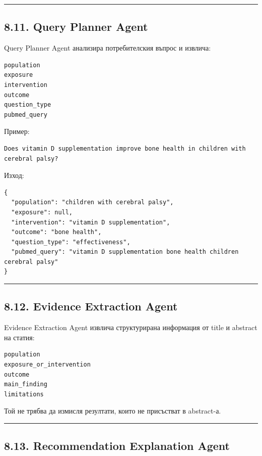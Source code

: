 \documentclass[12pt,a4paper]{article}
\begin{document}
\vspace{0.5em}\hrule\vspace{1.0em}

\subsection{8.11. Query Planner Agent}\label{query-planner-agent}

Query Planner Agent анализира потребителския въпрос и извлича:

\begin{verbatim}
population
exposure
intervention
outcome
question_type
pubmed_query
\end{verbatim}

Пример:

\begin{verbatim}
Does vitamin D supplementation improve bone health in children with cerebral palsy?
\end{verbatim}

Изход:

\begin{verbatim}
{
  "population": "children with cerebral palsy",
  "exposure": null,
  "intervention": "vitamin D supplementation",
  "outcome": "bone health",
  "question_type": "effectiveness",
  "pubmed_query": "vitamin D supplementation bone health children cerebral palsy"
}
\end{verbatim}

\vspace{0.5em}\hrule\vspace{1.0em}

\subsection{8.12. Evidence Extraction Agent}\label{evidence-extraction-agent}

Evidence Extraction Agent извлича структурирана информация от title и abstract на статия:

\begin{verbatim}
population
exposure_or_intervention
outcome
main_finding
limitations
\end{verbatim}

Той не трябва да измисля резултати, които не присъстват в abstract-а.

\vspace{0.5em}\hrule\vspace{1.0em}

\subsection{8.13. Recommendation Explanation Agent}\label{recommendation-explanation-agent}
\end{document}
